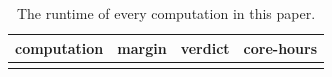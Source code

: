 \documentclass[
]{article}
\begin{document}
\begin{table}[!htbp]
\centering
\caption{The runtime of every computation in this paper.}
\begin{tabular}{@{}
  >{\raggedright\arraybackslash}p{}
  >{\raggedright\arraybackslash}p{}
  >{\raggedright\arraybackslash}p{}
  >{\raggedleft\arraybackslash}p{}@{}}
\toprule\noalign{}
\begin{minipage}[b]{\linewidth}\raggedright
computation
\end{minipage} & \begin{minipage}[b]{\linewidth}\raggedright
margin
\end{minipage} & \begin{minipage}[b]{\linewidth}\raggedright
verdict
\end{minipage} & \begin{minipage}[b]{\linewidth}\raggedleft
core-hours
\end{minipage} \\
\midrule\noalign{}


\end{tabular}
\end{table}
\end{document}
